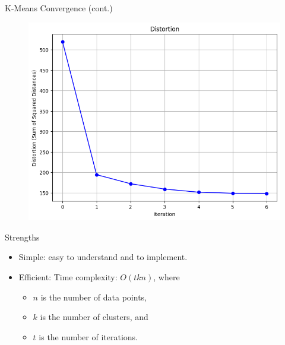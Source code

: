 \documentclass[serif, aspectratio=169]{beamer}
\begin{document}
\begin{frame}{K-Means Convergence (cont.)}
    \begin{figure}
        \centering
        \includegraphics[scale=0.45]{pic/figs/distortion.png}
        
    \end{figure}
\end{frame}


\begin{frame}{Strengths}
    \begin{itemize}
        \item Simple: easy to understand and to implement.
        \item  Efficient: Time complexity: $O(tkn)$, 
where
\begin{itemize}
    
\item  $n$ is the number of data points, 
\item $k$ is the number of clusters, and 
\item $t$ is the number of iterations. 
\end{itemize}
        
    \end{itemize}
\end{frame}
\end{document}

